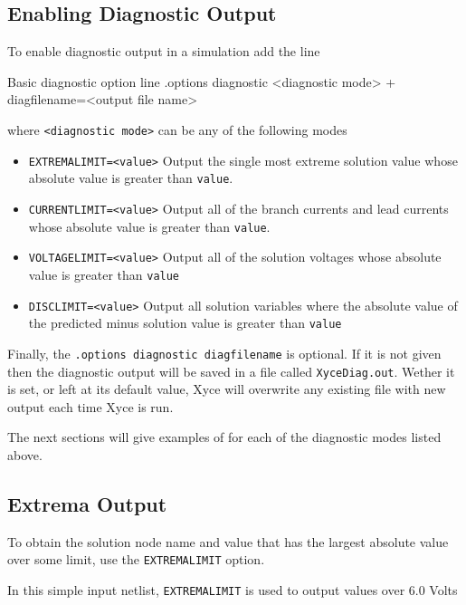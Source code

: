 \subsection{Enabling Diagnostic Output}
To enable diagnostic output in a simulation add the line
\begin{NetlistFigure}{Basic diagnostic option line}
.options diagnostic <diagnostic mode> 
+ diagfilename=<output file name>
\end{NetlistFigure}
where \texttt{<diagnostic mode>} can be any of the following modes
\begin{itemize}
  \item \texttt{EXTREMALIMIT=<value>}  Output the single most extreme solution value 
    whose absolute value is greater than \texttt{value}.
  \item \texttt{CURRENTLIMIT=<value>}  Output all of the branch currents and lead currents  
    whose absolute value is greater than \texttt{value}.
  \item \texttt{VOLTAGELIMIT=<value>}  Output all of the solution voltages  
    whose absolute value is greater than \texttt{value}
  \item \texttt{DISCLIMIT=<value>}  Output all solution variables where the absolute value
    of the predicted minus solution value is greater than \texttt{value}
\end{itemize}

Finally, the \texttt{.options diagnostic diagfilename} is optional.  If it is not given then 
the diagnostic output will be saved in a file called \texttt{XyceDiag.out}.  Wether it 
is set, or left at its default value, Xyce will overwrite any existing file with new 
output each time Xyce is run.  

The next sections will give examples of for each of the diagnostic modes listed above.

\subsection{Extrema Output}
To obtain the solution node name and value that has the largest absolute value over some 
limit, use the \texttt{EXTREMALIMIT} option. 

In this simple \Xyce{} input netlist, \texttt{EXTREMALIMIT} is used to output values over 6.0 Volts


